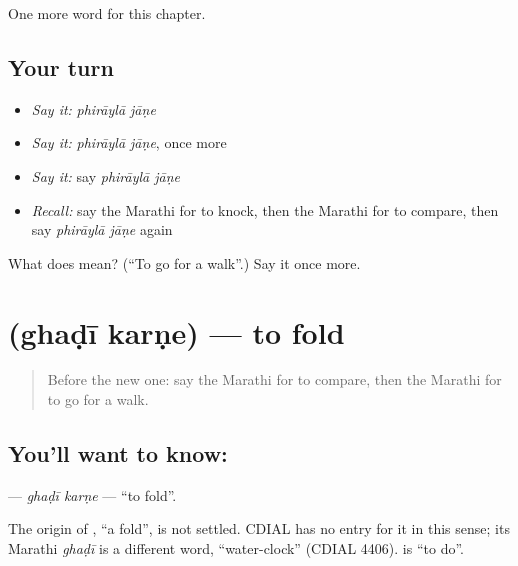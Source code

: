 \begin{grammarlens}[title={What you've built}]
One more word for this chapter.
\end{grammarlens}

\subsection*{Your turn}
\begin{itemize}
\raggedright
  \item \emph{Say it:} \emph{phirāylā jāṇe}
  \item \emph{Say it:} \emph{phirāylā jāṇe}, once more
  \item \emph{Say it:} say \emph{phirāylā jāṇe}
  \item \emph{Recall:} say the Marathi for to knock, then the Marathi for to compare, then say \emph{phirāylā jāṇe} again
\end{itemize}

\begin{tcolorbox}[breakable,colback=teal!4,colframe=teal!35!black,title={Before you move on}]
What does   mean? (\textquotedblleft{}To go for a walk\textquotedblright{}.) Say it once more.
\end{tcolorbox}
\section[\texorpdfstring{\mr{घडी} \mr{करणे} (ghaḍī karṇe)}{घडी करणे (ghaḍī karṇe)}]{  (ghaḍī karṇe) — to fold}

\label{lesson:MR-C196-ghadi-karne}



\begin{quote}
Before the new one: say the Marathi for to compare, then the Marathi for to go for a walk.
\end{quote}

\subsection*{You'll want to know:  }
\textbf{ } — \emph{ghaḍī karṇe} — \textquotedblleft{}to fold\textquotedblright{}.

\begin{cousinweb}
The origin of \textbf{}, \textquotedblleft{}a fold\textquotedblright{}, is not settled. CDIAL has no entry for it in this sense; its Marathi \emph{ghaḍī} is a different word, \textquotedblleft{}water-clock\textquotedblright{} (CDIAL 4406). \textbf{} is \textquotedblleft{}to do\textquotedblright{}.
\end{cousinweb}

